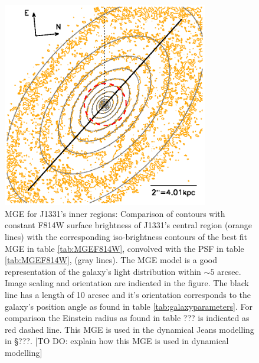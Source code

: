 
\begin{figure}
\begin{minipage}[c]{\linewidth}
\centering
\includegraphics[width=0.8\textwidth]{fig/1331F814Wsci_MGE_M.ps}
\caption{MGE for J1331's inner regions: Comparison of contours with constant F814W surface brightness of J1331's central region (orange lines) with the corresponding iso-brightness contours of the best fit MGE in table \ref{tab:MGEF814W}, convolved with the PSF in table \ref{tab:MGEF814W}, (gray lines). The MGE model is a good representation of the galaxy's light distribution within $\sim 5$ arcsec. Image scaling and orientation are indicated in the figure. The black line has a length of 10 arcsec and it's orientation corresponds to the galaxy's position angle as found in table \ref{tab:galaxyparameters}. For comparison the Einstein radius as found in table ??? is indicated as red dashed line. This MGE is used in the dynamical Jeans modelling in \S ???. [TO DO: explain how this MGE is used in dynamical modelling]}
\label{fig:MGEinnerRegions}
\end{minipage}
\begin{minipage}[c]{\linewidth}
\centering

\end{minipage}
\end{figure}
